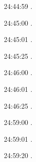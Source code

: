 24:44:59 .

24:45:00 .

24:45:01 .

24:45:25 .

24:46:00 .

24:46:01 .

24:46:25 .

24:59:00 .

24:59:01 .

24:59:20 .

